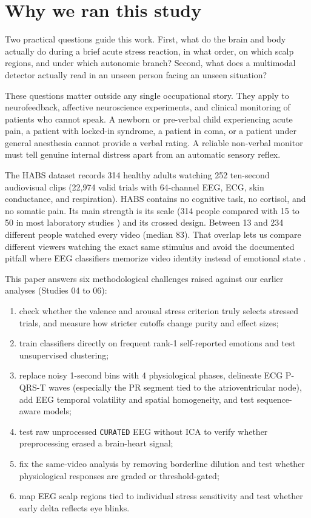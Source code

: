 \documentclass[10pt]{article}
\begin{document}
\section{Why we ran this study}

Two practical questions guide this work. First, what do the brain and body actually do during a brief acute stress reaction, in what order, on which scalp regions, and under which autonomic branch? Second, what does a multimodal detector actually read in an unseen person facing an unseen situation?

These questions matter outside any single occupational story. They apply to neurofeedback, affective neuroscience experiments, and clinical monitoring of patients who cannot speak. A newborn or pre-verbal child experiencing acute pain, a patient with locked-in syndrome, a patient in coma, or a patient under general anesthesia cannot provide a verbal rating. A reliable non-verbal monitor must tell genuine internal distress apart from an automatic sensory reflex.

The HABS dataset records 314 healthy adults watching 252 ten-second audiovisual clips (22,974 valid trials with 64-channel EEG, ECG, skin conductance, and respiration). HABS contains no cognitive task, no cortisol, and no somatic pain. Its main strength is its scale (314 people compared with 15 to 50 in most laboratory studies \cite{palomba2000,hagenaars2014,schubring2019}) and its crossed design. Between 13 and 234 different people watched every video (median 83). That overlap lets us compare different viewers watching the exact same stimulus and avoid the documented pitfall where EEG classifiers memorize video identity instead of emotional state \cite{giannakakis2015,gerster2026}.

This paper answers six methodological challenges raised against our earlier analyses (Studies 04 to 06):
\begin{enumerate}
\item check whether the valence and arousal stress criterion truly selects stressed trials, and measure how stricter cutoffs change purity and effect sizes;
\item train classifiers directly on frequent rank-1 self-reported emotions and test unsupervised clustering;
\item replace noisy 1-second bins with 4 physiological phases, delineate ECG P-QRS-T waves (especially the PR segment tied to the atrioventricular node), add EEG temporal volatility and spatial homogeneity, and test sequence-aware models;
\item test raw unprocessed \texttt{CURATED} EEG without ICA to verify whether preprocessing erased a brain-heart signal;
\item fix the same-video analysis by removing borderline dilution and test whether physiological responses are graded or threshold-gated;
\item map EEG scalp regions tied to individual stress sensitivity and test whether early delta reflects eye blinks.
\end{enumerate}
\end{document}
